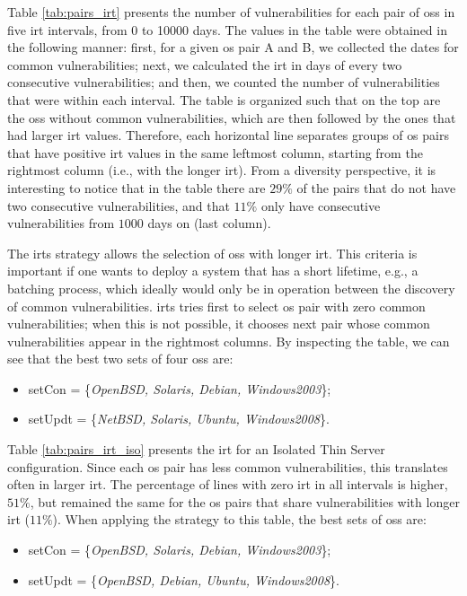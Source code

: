 Table \ref{tab:pairs_irt} presents the number of vulnerabilities for each pair of \glspl{os} in five \gls{irt} intervals, from 0 to 10000 days.
The values in the table were obtained in the following manner: first, for a given \gls{os} pair A and B, we collected the dates for common vulnerabilities; next, we calculated the \gls{irt} in days of every two consecutive vulnerabilities; and then, we counted the number of vulnerabilities that were within each interval.
The table is organized such that on the top are the \glspl{os} without common vulnerabilities, which are then followed by the ones that had larger \gls{irt} values. 
Therefore, each horizontal line separates groups of \gls{os} pairs that have positive \gls{irt} values in the same leftmost column, starting from the rightmost column (i.e., with the longer \gls{irt}). 
From a diversity perspective, it is interesting to notice that in the table there are $29\%$ of the pairs that do not have two consecutive vulnerabilities, and that $11\%$ only have consecutive vulnerabilities from $1000$ days on (last column).

The \gls{irts} strategy allows the selection of \glspl{os} with longer \gls{irt}. 
This criteria is important if one wants to deploy a system that has a short lifetime, e.g., a batching process, which ideally would only be in operation between the discovery of common vulnerabilities. 
\gls{irts} tries first to select \gls{os} pair with zero common vulnerabilities; when this is not possible, it chooses next pair whose common vulnerabilities appear in the rightmost columns. 
By inspecting the table, we can see that the best two sets of four \glspl{os} are:

\begin{itemize}
\item setCon = \{\emph{OpenBSD, Solaris, Debian, Windows2003}\};
\item setUpdt = \{\emph{NetBSD, Solaris, Ubuntu, Windows2008}\}.
\end{itemize}


Table \ref{tab:pairs_irt_iso} presents the \gls{irt} for an Isolated Thin Server configuration. 
Since each \gls{os} pair has less common vulnerabilities, this translates often in larger \gls{irt}.  
The percentage of lines with zero \gls{irt} in all intervals is higher, $51\%$, but remained the same for the \gls{os} pairs that share vulnerabilities with longer \gls{irt} ($11\%$). 
When applying the strategy to this table, the best sets of \glspl{os} are: 

\begin{itemize}
\item setCon = \{\emph{OpenBSD, Solaris, Debian, Windows2003}\};
\item setUpdt = \{\emph{OpenBSD, Debian, Ubuntu, Windows2008}\}.
\end{itemize}


